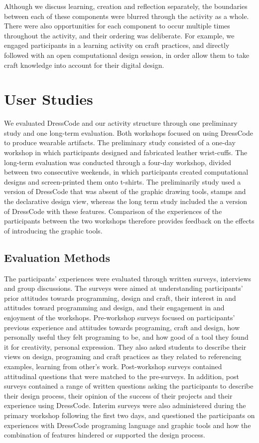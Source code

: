 \documentclass{sigchi}
\begin{document}
Although we discuss learning, creation and reflection separately, the boundaries between each of these components were blurred through the activity as a whole. There were also opportunities for each component to occur multiple times throughout the activity, and their ordering was deliberate. For example, we engaged participants in a learning activity on craft practices, and directly followed with an open computational design session, in order allow them to take craft knowledge into account for their digital design. 

\section{User Studies}
We evaluated DressCode and our activity structure through one preliminary study and one long-term evaluation. Both workshops focused on using DressCode to produce wearable artifacts. The preliminary study consisted of a one-day workshop in which participants designed and fabricated leather wrist-cuffs. The long-term evaluation was conducted through a four-day workshop, divided between two consecutive weekends, in which participants created computational designs and screen-printed them onto t-shirts. The preliminarily study used a version of DressCode that was absent of the graphic drawing tools, stamps and the declarative design view, whereas the long term study included the a version of DressCode with these features. Comparison of the experiences of the participants between the two workshops therefore provides feedback on the effects of introducing the graphic tools.

\subsection{Evaluation Methods}
The participants' experiences were evaluated through written surveys, interviews and group discussions. The surveys were aimed at understanding participants’ prior attitudes towards programming, design and craft, their interest in and attitudes toward programming and design, and their engagement in and enjoyment of the workshops. Pre-workshop surveys focused on participants’ previous experience and attitudes towards programing, craft and design, how personally useful they felt programing to be, and how good of a tool they found it for creativity, personal expression. They also asked students to describe their views on design, programing and craft practices as they related to referencing examples, learning from other's work. Post-workshop surveys contained attitudinal questions that were matched to the pre-surveys. In addition, post surveys contained a range of written questions asking the participants to describe their design process, their opinion of the success of their projects and their experience using DressCode. Interim surveys were also administered during the primary workshop following the first two days, and questioned the participants on experiences with DressCode programing language and graphic tools and how the combination of features hindered or supported the design process.
\end{document}
